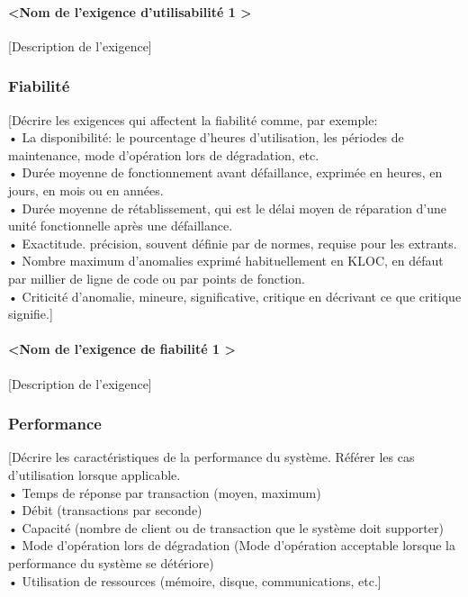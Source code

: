 \documentclass[10pt,a4paper]{report}
\begin{document}
\paragraph{\textless Nom de l’exigence d’utilisabilité 1 \textgreater}
[Description de l’exigence]

\subsubsection{Fiabilité}
[Décrire les exigences qui affectent la fiabilité comme, par exemple:\\
•	La disponibilité: le pourcentage d’heures d’utilisation, les périodes de maintenance, mode d’opération lors de dégradation, etc.\\
•	Durée moyenne de fonctionnement avant défaillance, exprimée en heures, en jours, en mois ou en années.\\
•	Durée moyenne de rétablissement, qui est le délai moyen de réparation d'une unité fonctionnelle après une défaillance.\\
•	Exactitude. précision, souvent définie par de normes, requise pour les extrants.\\
•	Nombre maximum d’anomalies exprimé habituellement en KLOC, en défaut par millier de ligne de code ou par points de fonction.\\
•	Criticité d’anomalie, mineure, significative, critique en décrivant ce que critique signifie.]
\paragraph{\textless Nom de l’exigence de fiabilité 1 \textgreater}
[Description de l’exigence]

\subsubsection{Performance}
[Décrire les caractéristiques de la performance du système. Référer les cas d’utilisation lorsque applicable.\\
•	Temps de réponse par transaction (moyen, maximum)\\
•	Débit (transactions par seconde)\\
•	Capacité (nombre de client ou de transaction que le système doit supporter)\\
•	Mode d’opération lors de dégradation (Mode d’opération acceptable lorsque la performance du système se détériore)\\
•	Utilisation de ressources (mémoire, disque, communications, etc.]
\end{document}
